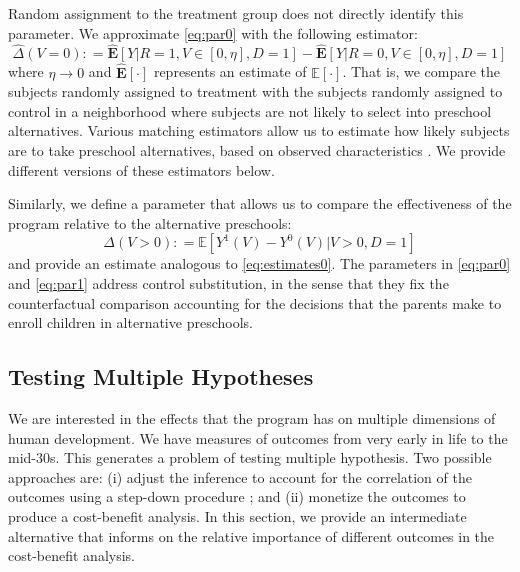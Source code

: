 \noindent Random assignment to the treatment group does not directly identify this parameter. We approximate \eqref{eq:par0} with the following estimator: 
\begin{equation}
\widehat{\Delta} \left(V = 0 \right) : = \widehat{\mathbf{E}} \left[ Y | R = 1, V \in \left[ 0 , \eta \right], D = 1 \right] - \widehat{\mathbf{E}} \left[ Y | R = 0, V \in \left[ 0 , \eta \right], D = 1 \right] \label{eq:estimates0}
\end{equation}
where $\eta \rightarrow 0$ and $\widehat{\mathbf{E}}[\cdot]$ represents an estimate of $\mathbb{E}[\cdot]$. That is, we compare the subjects randomly assigned to treatment with the subjects randomly assigned to control in a neighborhood where subjects are not likely to select into preschool alternatives. Various matching estimators allow us to estimate how likely subjects are to take preschool alternatives, based on observed characteristics \citep{Heckman_Ichimura_etal_1997_REStud,Heckman_Ichimura_etal_1998_REStud}. We provide different versions of these estimators below.

Similarly, we define a parameter that allows us to compare the effectiveness of the program relative to the alternative preschools:
\begin{equation}
\Delta \left( V > 0 \right) : =   \mathbb{E} \left[ Y^1 \left(V \right) - Y^0 \left( V \right) | V > 0, D = 1 \right] \label{eq:par1}
\end{equation}
and provide an estimate analogous to \eqref{eq:estimates0}. The parameters in \eqref{eq:par0} and \eqref{eq:par1} address control substitution, in the sense that they fix the counterfactual comparison accounting for the decisions that the parents make to enroll children in alternative preschools.

\subsection{Testing Multiple Hypotheses}  \label{section:counts}

We are interested in the effects that the program has on multiple dimensions of human development. We have measures of outcomes from very early in life to the mid-30s. This generates a problem of testing multiple hypothesis. Two possible approaches are: (i) adjust the inference to account for the correlation of the outcomes using a step-down procedure \citep{Lehman_Romano_2005_AnnStat,Romano_Shaikh_2006_AnnStat}; and (ii) monetize the outcomes to produce a cost-benefit analysis. In this section, we provide an intermediate alternative that informs on the relative importance of different outcomes in the cost-benefit analysis.

